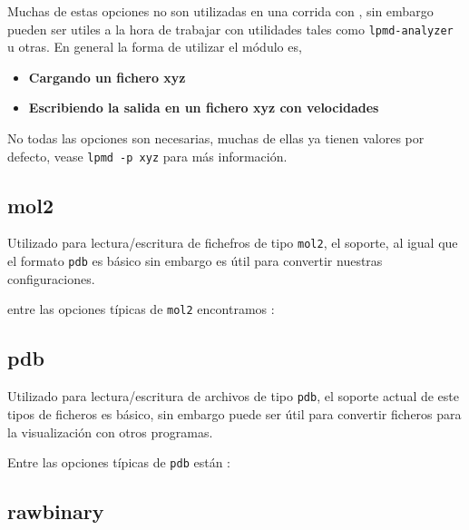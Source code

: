 Muchas de estas opciones no son utilizadas en una corrida con {\lpmd}, sin
embargo pueden ser utiles a la hora de trabajar con utilidades tales como
\verb|lpmd-analyzer| u otras. En general la forma de utilizar el m\'odulo es,

\begin{itemize}
 \item \textbf{Cargando un fichero xyz}
 \item \textbf{Escribiendo la salida en un fichero xyz con velocidades}
\end{itemize}


No todas las opciones son necesarias, muchas de ellas ya tienen valores por
defecto, vease \verb|lpmd -p xyz| para m\'as informaci\'on.

\subsection{mol2}

Utilizado para lectura/escritura de fichefros de tipo \verb|mol2|, el soporte,
al igual que el formato \verb|pdb| es b\'asico sin embargo es \'util para
convertir nuestras configuraciones.

entre las opciones t\'ipicas de \verb|mol2| encontramos :


\subsection{pdb}

Utilizado para lectura/escritura de archivos de tipo \verb|pdb|, el soporte
actual de este tipos de ficheros es b\'asico, sin embargo puede ser \'util para
convertir ficheros para la visualizaci\'on con otros programas.

Entre las opciones t\'ipicas de \verb|pdb| est\'an :


\subsection{rawbinary}


